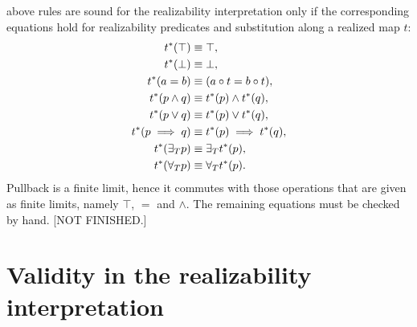 above rules are sound for the realizability interpretation only if the
corresponding equations hold for realizability predicates and
substitution along a realized map $t$:
%
\begin{align*}
  t^{*}(\top) &\equiv \top,\\
  t^{*}(\bot) &\equiv \bot,\\
  t^{*}(a = b) &\equiv (a \circ t = b \circ t),\\
  t^{*}(p \land q) &\equiv t^{*}(p) \land t^{*}(q),\\
  t^{*}(p \lor q) &\equiv t^{*}(p) \lor t^{*}(q),\\
  t^{*}(p \implies q) &\equiv t^{*}(p) \implies t^{*}(q),\\
  t^{*}(\exists_{T} p) &\equiv \exists_{T} t^{*}(p),\\
  t^{*}(\forall_{T} p) &\equiv \forall_{T} t^{*}(p).
\end{align*}
%
Pullback is a finite limit, hence it commutes with those operations
that are given as finite limits, namely $\top$, $=$ and $\land$. The
remaining equations must be checked by hand. [NOT FINISHED.]


\section{Validity in the realizability interpretation}
\label{sec:realizability-validity}

